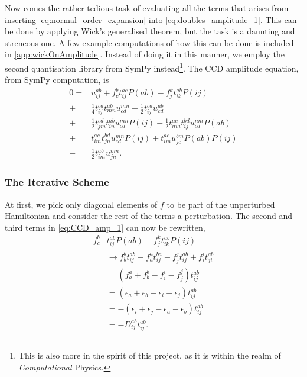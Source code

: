 \documentclass[
    a4paper, aps, twocolumn, floatfix, superscriptaddress,
    nofootinbib]{revtex4-1}
\newcommand{\1}{\mathds{1}}
\begin{document}
        Now comes the rather tedious task of evaluating all the terms
        that arises from inserting \autoref{eq:normal_order_expansion}
        into \autoref{eq:doubles_amplitude_1}. This can be done by applying
        Wick's generalised theorem, but the task is a daunting and streneous one.
        A few example computations of how this can be done is included in
        \autoref{app:wickOnAmplitude}.
         Instead of doing it in this manner, we employ the second quantisation library
         from SymPy instead\footnote{This is also more in the spirit of this project,
         as it is within the realm of \emph{Computational} Physics.}.
        The CCD amplitude equation, from SymPy computation, is
        \begin{equation}
        \begin{aligned}
            0 =& u^{ab}_{ij} + f^b_c t^{ac}_{ij}P(ab) - f^k_jt^{ab}_{ik}P(ij) \\
                 +& \frac{1}{4}t^{cd}_{ij} t^{ab}_{mn} u^{mn}_{cd} + \frac{1}{2}t^{cd}_{ij} u^{ab}_{cd} \\
                 +& \frac{1}{2}t^{cd}_{jm} t^{ab}_{in} u^{mn}_{cd} P(ij) - \frac{1}{2}t^{ac}_{nm} t^{bd}_{ij} u^{nm}_{cd} P(ab) \\
                 +& t^{ac}_{im} t^{bd}_{jn} u^{mn}_{cd} P(ij) + t^{ac}_{im} u^{bm}_{jc} P(ab) P(ij) \\
                 -& \frac{1}{2}t^{ab}_{im} u^{mn}_{jn}.
        \label{eq:CCD_amp_1}
        \end{aligned}
        \end{equation}

        \subsubsection{The Iterative Scheme}
        At first, we pick only diagonal elements of $f$ to be part of the unperturbed
        Hamiltonian and consider the rest of the terms a perturbation.
        The second and third terms in \autoref{eq:CCD_amp_1} can now be
        rewritten,
        \begin{equation}
        \begin{aligned}
            f^b_c&t_{ij}^{ab}P(ab) - f^k_j t_{ik}^{ab}P(ij) \\
                &\to f^b_bt_{ij}^{ab} - f^a_at_{ij}^{ba} - f^j_jt_{ij}^{ab} + f^i_it_{ji}^{ab} \\
                &= (f^a_a + f^b_b - f^i_i - f^j_j)t_{ij}^{ab} \\
                &= (\epsilon_a + \epsilon_b - \epsilon_i - \epsilon_j)t_{ij}^{ab} \\
                &= -(\epsilon_i + \epsilon_j - \epsilon_a - \epsilon_b)t_{ij}^{ab} \\
                &= -D_{ij}^{ab}t_{ij}^{ab}.
        \end{aligned}
        \end{equation}
\end{document}

